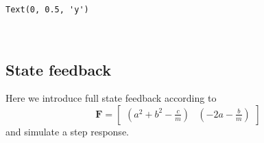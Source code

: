 \documentclass[11pt,a4paper, d]{scrartcl}
\makeatletter
\newcommand{\boxspacing}{\kern\kvtcb@left@rule\kern\kvtcb@boxsep}
\newcommand{\prompt}[4]{
        {\ttfamily\llap{{\color{#2}[#3]:\hspace{3pt}#4}}\vspace{-\baselineskip}}
    }
\makeatother
\begin{document}
            \begin{tcolorbox}[breakable, size=fbox, boxrule=.5pt, pad at break*=1mm, opacityfill=0]
\prompt{Out}{outcolor}{7}{\boxspacing}
\begin{Verbatim}[commandchars=\\\{\}]
Text(0, 0.5, 'y')
\end{Verbatim}
\end{tcolorbox}
        
    \begin{center}
    \end{center}
    { \hspace*{\fill} \\}
    
    \hypertarget{state-feedback}{%
\subsection{State feedback}\label{state-feedback}}

Here we introduce full state feedback according to \begin{equation*}
\mathbf{F} = \begin{bmatrix} \left(a^2+b^2 - \frac{c}{m}\right) & \left(-2a - \frac{b}{m}\right)\end{bmatrix}
\end{equation*} and simulate a step response.
\end{document}
